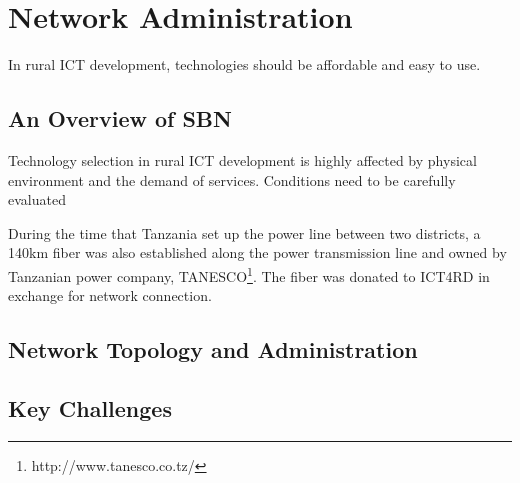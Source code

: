 \chapter{Network Administration}
In rural ICT development, technologies should be affordable and easy to use.
\section{An Overview of SBN}
Technology selection in rural ICT development is highly affected by physical environment and the demand of services. Conditions need to be carefully evaluated 

During the time that Tanzania set up the power line between two districts, a 140km fiber was also established along the power transmission line and owned by Tanzanian power company, TANESCO\footnote{http://www.tanesco.co.tz/}. The fiber was donated to ICT4RD in exchange for network connection. 
\section{Network Topology and Administration}
\section{Key Challenges}
